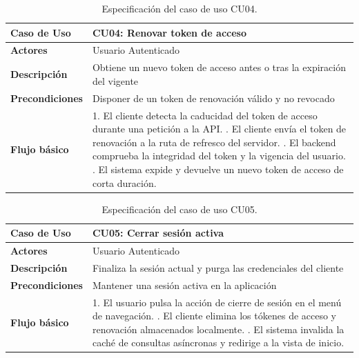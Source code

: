 \begin{table}[H]
\centering
\begin{tabular}{|p{3.1cm}|p{10.9cm}|}
\hline
\textbf{Caso de Uso} & \textbf{CU04: Renovar token de acceso} \\ \hline
\textbf{Actores} & Usuario Autenticado \\ \hline
\textbf{Descripción} & Obtiene un nuevo token de acceso antes o tras la expiración del vigente \\ \hline
\textbf{Precondiciones} & Disponer de un token de renovación válido y no revocado \\ \hline
\textbf{Flujo básico} & 
1. El cliente detecta la caducidad del token de acceso durante una petición a la API. \newline
2. El cliente envía el token de renovación a la ruta de refresco del servidor. \newline
3. El backend comprueba la integridad del token y la vigencia del usuario. \newline
4. El sistema expide y devuelve un nuevo token de acceso de corta duración. \\ \hline
\end{tabular}
\caption{Especificación del caso de uso CU04.}
\label{tab:cu04}
\end{table}

\begin{table}[H]
\centering
\begin{tabular}{|p{3.1cm}|p{10.9cm}|}
\hline
\textbf{Caso de Uso} & \textbf{CU05: Cerrar sesión activa} \\ \hline
\textbf{Actores} & Usuario Autenticado \\ \hline
\textbf{Descripción} & Finaliza la sesión actual y purga las credenciales del cliente \\ \hline
\textbf{Precondiciones} & Mantener una sesión activa en la aplicación \\ \hline
\textbf{Flujo básico} & 
1. El usuario pulsa la acción de cierre de sesión en el menú de navegación. \newline
2. El cliente elimina los tókenes de acceso y renovación almacenados localmente. \newline
3. El sistema invalida la caché de consultas asíncronas y redirige a la vista de inicio. \\ \hline
\end{tabular}
\caption{Especificación del caso de uso CU05.}
\label{tab:cu05}
\end{table}

